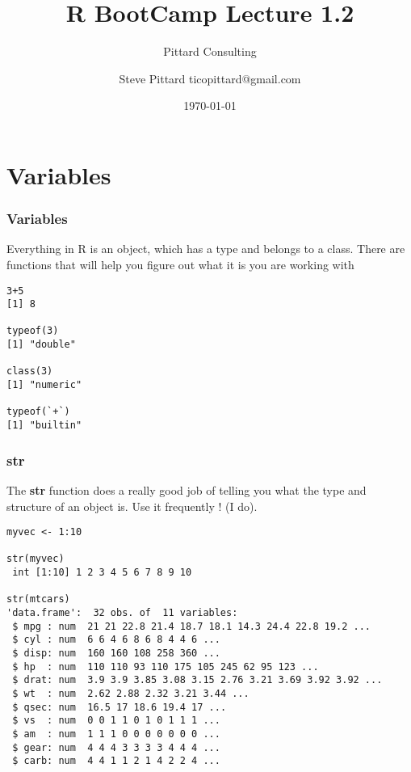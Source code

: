\documentclass{beamer}
\begin{document}


\title{R BootCamp Lecture 1.2}
\author{Steve Pittard ticopittard@gmail.com}
\subtitle{Pittard Consulting}
\date{\today}

\maketitle


\section{Variables}

\begin{frame}[fragile]
\frametitle{Variables}
Everything in R is an object, which has a type and belongs to a class. There are functions that will help you figure out what it is you are working with
\small
\begin{verbatim}
3+5
[1] 8

typeof(3)
[1] "double"

class(3)
[1] "numeric"

typeof(`+`)
[1] "builtin"

\end{verbatim}
\end{frame}

%

\begin{frame}[fragile]
\frametitle{str}
The \textbf{str} function  does a really good job of telling you what the type and structure of an object is. Use it frequently ! (I do).
\newline
\scriptsize
\begin{verbatim}
myvec <- 1:10

str(myvec)
 int [1:10] 1 2 3 4 5 6 7 8 9 10
 
str(mtcars)
'data.frame':  32 obs. of  11 variables:
 $ mpg : num  21 21 22.8 21.4 18.7 18.1 14.3 24.4 22.8 19.2 ...
 $ cyl : num  6 6 4 6 8 6 8 4 4 6 ...
 $ disp: num  160 160 108 258 360 ...
 $ hp  : num  110 110 93 110 175 105 245 62 95 123 ...
 $ drat: num  3.9 3.9 3.85 3.08 3.15 2.76 3.21 3.69 3.92 3.92 ...
 $ wt  : num  2.62 2.88 2.32 3.21 3.44 ...
 $ qsec: num  16.5 17 18.6 19.4 17 ...
 $ vs  : num  0 0 1 1 0 1 0 1 1 1 ...
 $ am  : num  1 1 1 0 0 0 0 0 0 0 ...
 $ gear: num  4 4 4 3 3 3 3 4 4 4 ...
 $ carb: num  4 4 1 1 2 1 4 2 2 4 ...
\end{verbatim}
\end{frame}
\end{document}
